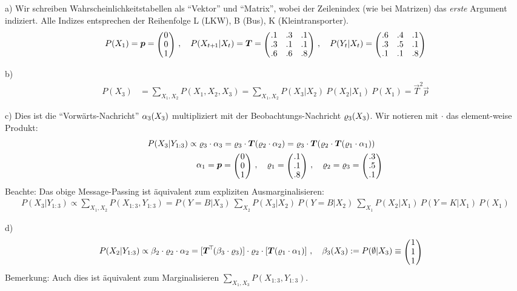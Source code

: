 \begin{solution}
a) Wir schreiben Wahrscheinlichkeitstabellen als ``Vektor'' und
``Matrix'', wobei der Zeilenindex (wie bei Matrizen) das \emph{erste}
Argument indiziert. Alle Indizes entsprechen der Reihenfolge L (LKW),
B (Bus), K (Kleintransporter).
\begin{align}
P(X_1) = \vec p = \mat{c}{ 0 \\ 0 \\ 1} \comma
P(X_{t\po}|X_t) = \vec T = \mat{ccc}{
.1 & .3 & .1 \\
.3 & .1 & .1 \\
.6 & .6 & .8 }\comma
P(Y_t|X_t) = \mat{ccc}{
.6 & .4 & .1 \\
.3 & .5 & .1 \\
.1 & .1 & .8 }
\end{align}

b)
\begin{align}
P(X_3)
&= \sum_{X_1,X_2} P(X_1,X_2,X_3)
 = \sum_{X_1,X_2} P(X_3|X_2)~ P(X_2|X_1)~ P(X_1) = \vec T^2 \vec p
\end{align}

c) Dies ist die ``Vorwärts-Nachricht'' $\alpha_3(X_3)$ multipliziert mit der
Beobachtungs-Nachricht $\varrho_3(X_3)$. Wir notieren mit $\cdot$ 
das element-weise Produkt:
\begin{align}
P(X_3|Y_{1:3})
&\propto \r_3 \cdot \a_3
= \r_3 \cdot \vec T (\r_2 \cdot \a_2)
= \r_3 \cdot \vec T (\r_2 \cdot \vec T(\r_1 \cdot \a_1))\\
&\quad \a_1 = \vec p = \mat{c}{ 0 \\ 0 \\ 1} \comma
\r_1 = \mat{c}{ .1 \\ .1 \\ .8} \comma
\r_2 = \r_3 = \mat{c}{ .3 \\ .5 \\ .1}
\end{align}
Beachte: Das obige Message-Passing ist äquivalent zum
expliziten Ausmarginalisieren:
\begin{align}
P(X_3|Y_{1:3})
\propto \sum_{X_1, X_2} P(X_{1:3},Y_{1:3})
= P(Y=B|X_3)~ \sum_{X_2} P(X_3|X_2)~ P(Y=B|X_2)~ \sum_{X_1} P(X_2|X_1)~ P(Y=K|X_1)~ P(X_1)
\end{align}


d) \begin{align}
P(X_2|Y_{1:3})
&\propto \b_2 \cdot \r_2 \cdot \a_2
= [\vec T^\T (\b_3 \cdot \r_3)] \cdot \r_2 \cdot [\vec
T(\r_1 \cdot \a_1)] \comma \b_3(X_3) := P(\emptyset | X_3) \equiv \mat{c}{1\\1\\1}
\end{align}
Bemerkung: Auch dies ist äquivalent zum Marginalisieren $\sum_{X_1, X_3}
P(X_{1:3},Y_{1:3})$.


\end{solution}

